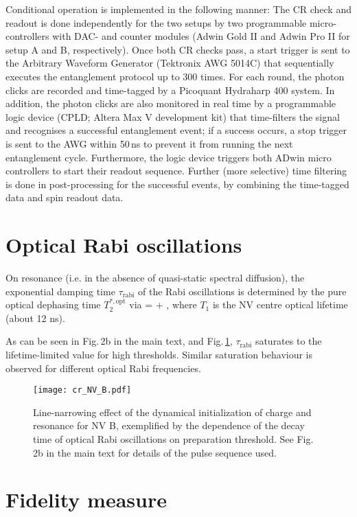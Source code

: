 Conditional operation is implemented in the following manner: The CR check and readout is done independently for the two setups by two programmable micro-controllers with DAC- and counter modules (Adwin Gold II and Adwin Pro II for setup A and B, respectively). Once both CR checks pass, a start trigger is sent to the Arbitrary Waveform Generator (Tektronix AWG 5014C) that sequentially executes the entanglement protocol up to 300 times. For each round, the photon clicks are recorded and time-tagged by a Picoquant Hydraharp 400 system. In addition, the photon clicks are also monitored in real time by a programmable logic device (CPLD; Altera Max V development kit) that time-filters the signal and recognises a successful entanglement event; if a success occurs, a stop trigger is sent to the AWG within 50\,ns to prevent it from running the next entanglement cycle. Furthermore, the logic device triggers both ADwin micro controllers to start their readout sequence. Further (more selective) time filtering is done in post-processing for the successful events, by combining the time-tagged data and spin readout data.

\section{Optical Rabi oscillations}
On resonance (i.e. in the absence of quasi-static spectral diffusion), the exponential damping time $\tau_{\text{rabi}}$ of the Rabi oscillations is determined by the pure optical dephasing time $T_2^{*,\text{opt}}$ via\cite{Robledo2010}
\be
{}= + ,
\ee
where $T_1$ is the NV centre optical lifetime (about 12 ns).

As can be seen in Fig.\,2b in the main text, and Fig.\,\ref{fig:cr_nv_B}, $\tau_{\text{rabi}}$ saturates to the lifetime-limited value for high thresholds. Similar saturation behaviour is observed for different optical Rabi frequencies.

\begin{figure}[h]
\centering
\texttt{[image: cr\_NV\_B.pdf]}
\caption{Line-narrowing effect of the dynamical initialization of charge and resonance for NV B, exemplified by the dependence of the decay time of optical Rabi oscillations on preparation threshold. See Fig.\,2b in the main text for details of the pulse sequence used.}
\label{fig:cr_nv_B}
\end{figure}


\section{Fidelity measure}

